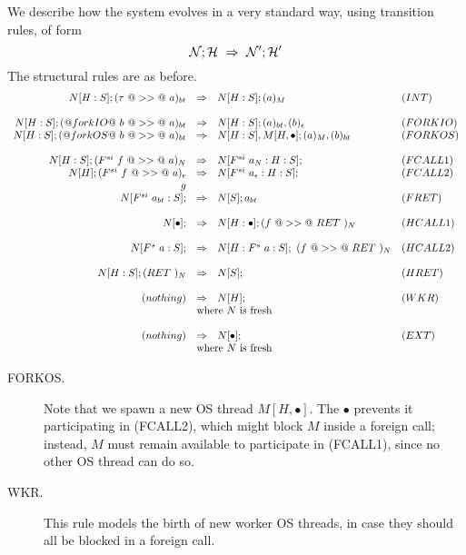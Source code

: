 \documentclass{article}
\newcommand{\NS}{{\cal N}}
\newcommand{\HS}{{\cal H}}
\newcommand{\hcall}{H}
\newcommand{\fcall}[2]{F^{#1}~#2}
\newcommand{\ret}[1]{RET~#1}
\begin{document}
We describe how the system evolves in a very standard way, using 
transition rules, of form
$$
\NS ; \HS ~\Rightarrow~ \NS' ; \HS'
$$
The structural rules are as before.
$$
\begin{array}{rcll}
N[\hcall:S]; (\tau~@>>@~a)_{bt} 
        & \Rightarrow 
        & N[\hcall:S]; (a)_{M} & (INT) \\
\\
N[\hcall:S]; (@forkIO@~b~@>>@~a)_{bt} 
        & \Rightarrow 
        & N[\hcall:S]; (a)_{bt}, (b)_\epsilon & (FORKIO) \\
N[\hcall:S]; (@forkOS@~b~@>>@~a)_{bt}
        & \Rightarrow 
        & N[\hcall:S], M[\hcall,\bullet]; (a)_{M}, (b)_{bt} & (FORKOS) \\
\\
N[\hcall:S]; (\fcall{si}{f}~@>>@~a)_N 
        & \Rightarrow 
        & N[\fcall{si}{a_N}:\hcall:S];  & (FCALL1) \\
N[\hcall]; (\fcall{si}{f}~@>>@~a)_\epsilon 
        & \Rightarrow 
        & N[\fcall{si}{a_\epsilon}:\hcall:S];  & (FCALL2) \\
g\\
N[\fcall{si}{a_{bt}}:S];  
        & \Rightarrow 
        & N[S]; a_{bt} & (FRET) \\
\\
N[\bullet];
        & \Rightarrow 
        & N[\hcall:\bullet];  (f ~@>>@~ \ret{})_{N} & (HCALL1) \\
\\
N[\fcall{s}{a} : S]; 
        & \Rightarrow 
        & N[\hcall : \fcall{s}{a} : S]; ~ (f ~@>>@~ \ret{})_{N} & (HCALL2) \\
 \\
N[\hcall : S]; (\ret{})_N
        & \Rightarrow 
        & N[S]; & (HRET) \\
\\
(nothing)
        & \Rightarrow 
        & N[\hcall]; & (WKR) \\
        & \multicolumn{2}{l}{\mbox{where $N$ is fresh}} \\
\\
(nothing)
        & \Rightarrow 
        & N[\bullet]; & (EXT) \\
        & \multicolumn{2}{l}{\mbox{where $N$ is fresh}} \\
\end{array}
$$

\begin{description}
\item[FORKOS.]  Note that we spawn a new OS thread $M[H,\bullet]$.  The $\bullet$ prevents it
participating in (FCALL2), which might block $M$ inside a foreign call; instead, $M$ must
remain available to participate in (FCALL1), since no other OS thread can do so.

\item[WKR.] This rule models the birth of new worker OS threads, in case they should
all be blocked in a foreign call.
\end{description}
\end{document}

